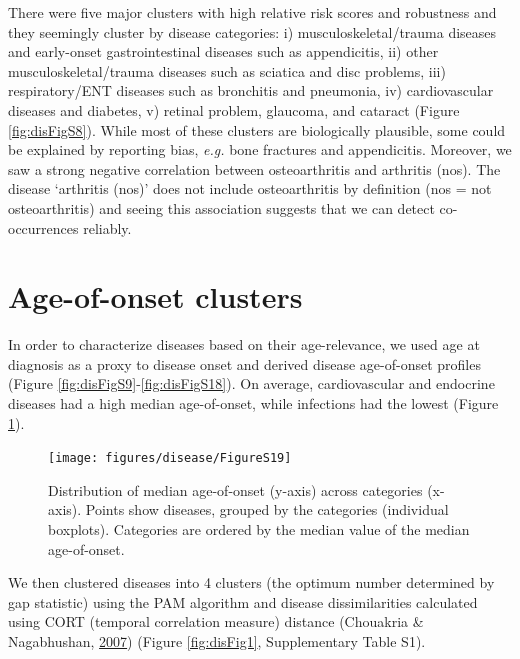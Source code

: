 \documentclass[12pt,twoside]{unicam}
\begin{document}
There were five major clusters with high relative risk scores and robustness and they seemingly cluster by disease categories: i) musculoskeletal/trauma diseases and early-onset gastrointestinal diseases such as appendicitis, ii) other musculoskeletal/trauma diseases such as sciatica and disc problems, iii) respiratory/ENT diseases such as bronchitis and pneumonia, iv) cardiovascular diseases and diabetes, v) retinal problem, glaucoma, and cataract (Figure \ref{fig:disFigS8}). While most of these clusters are biologically plausible, some could be explained by reporting bias, \emph{e.g.} bone fractures and appendicitis. Moreover, we saw a strong negative correlation between osteoarthritis and arthritis (nos). The disease `arthritis (nos)' does not include osteoarthritis by definition (nos = not osteoarthritis) and seeing this association suggests that we can detect co-occurrences reliably.

\hypertarget{age-of-onset-clusters}{%
\section{Age-of-onset clusters}\label{age-of-onset-clusters}}

In order to characterize diseases based on their age-relevance, we used age at diagnosis as a proxy to disease onset and derived disease age-of-onset profiles (Figure \ref{fig:disFigS9}-\ref{fig:disFigS18}). On average, cardiovascular and endocrine diseases had a high median age-of-onset, while infections had the lowest (Figure \ref{fig:disFigS19}).

\begin{figure}

{\centering \texttt{[image: figures/disease/FigureS19]} 

}

\caption[Distribution of median age-of-onset across categories.]{Distribution of median age-of-onset (y-axis) across categories (x-axis). Points show diseases, grouped by the categories (individual boxplots). Categories are ordered by the median value of the median age-of-onset.}\label{fig:disFigS19}
\end{figure}

We then clustered diseases into 4 clusters (the optimum number determined by gap statistic) using the PAM algorithm and disease dissimilarities calculated using CORT (temporal correlation measure) distance (Chouakria \& Nagabhushan, \protect\hyperlink{ref-Chouakria2007}{2007}) (Figure \ref{fig:disFig1}, Supplementary Table S1).
\end{document}
